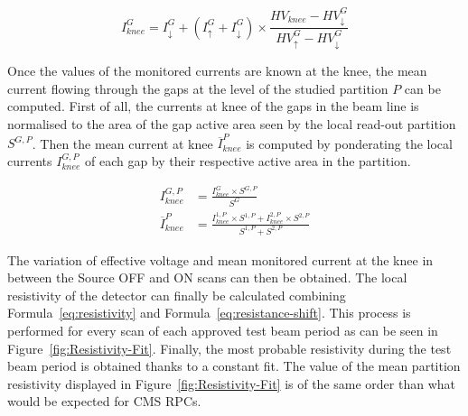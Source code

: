 	\begin{equation}
	\label{eq:extrapolation}
	I_{knee}^{G} = I_{\downarrow}^{G} + (I_{\uparrow}^{G} + I_{\downarrow}^{G})\times\frac{HV_{knee}-HV_{\downarrow}^{G}}{HV_{\uparrow}^{G} - HV_{\downarrow}^{G}}
	\end{equation}
	
	Once the values of the monitored currents are known at the knee, the mean current flowing through the gaps at the level of the studied partition $P$ can be computed. First of all, the currents at knee of the gaps in the beam line is normalised to the area of the gap active area seen by the local read-out partition $S^{G,P}$. Then the mean current at knee $\overline{I}_{knee}^{P}$ is computed by ponderating the local currents $I_{knee}^{G,P}$ of each gap by their respective active area in the partition.
	
	\begin{equation}
	\label{eq:meanI}
		\begin{aligned}
	I_{knee}^{G,P} &= \frac{I_{knee}^{G} \times S^{G,P}}{S^{G}}\\
	\overline{I}_{knee}^{P} &= \frac{I_{knee}^{1,P}\times S^{1,P} + I_{knee}^{2,P}\times S^{2,P}}{S^{1,P} + S^{2,P}}
		\end{aligned}
	\end{equation}
	
	The variation of effective voltage and mean monitored current at the knee in between the Source OFF and ON scans can then be obtained. The local resistivity of the detector can finally be calculated combining Formula~\ref{eq:resistivity} and Formula~\ref{eq:resistance-shift}. This process is performed for every scan of each approved test beam period as can be seen in Figure~\ref{fig:Resistivity-Fit}. Finally, the most probable resistivity during the test beam period is obtained thanks to a constant fit. The value of the mean partition resistivity displayed in Figure~\ref{fig:Resistivity-Fit} is of the same order than what would be expected for CMS RPCs.
	
